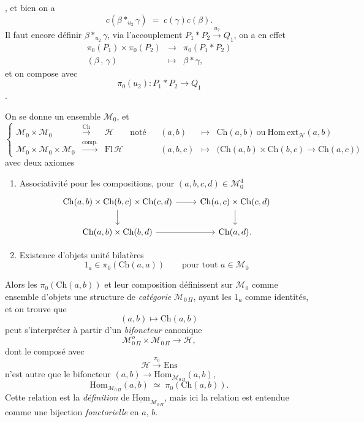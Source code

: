 \documentclass[11pt]{article}
\newcommand{\printedpage}[1]{\marginpar{\footnotesize p.~#1}}
\newcommand{\msp}[1]{\marginpar{\footnotesize [#1]}}
\newcommand{\MOP}{\mathcal{M}_{0\,\Pi}}
\begin{document}
\printedpage{5}
, et bien on a
\[
\boxed{\;c(\beta *_{u_2}\gamma) \;=\; c(\gamma)c(\beta).\;}
\]
Il faut encore définir $\beta *_{u_2}\gamma$, via l'accouplement $P_1*P_2\xrightarrow{u_2}Q_1$, on a en effet
\[
\begin{array}{ccc}
\pi_0(P_1)\times\pi_0(P_2) & \longrightarrow & \pi_0(P_1*P_2)\\
(\beta\,,\,\gamma) & \longmapsto & \beta*\gamma,
\end{array}
\]
et on compose avec
\[
\pi_0(u_2) : P_1*P_2 \longrightarrow Q_1
\]
.

\msp{page 7}
On se donne un ensemble $\mathcal{M}_0$, et
\[
\left\{
\begin{array}{rclccrcl}
\mathcal{M}_0\times\mathcal{M}_0 & \xrightarrow{\mathrm{Ch}} & \mathcal{H} & \text{noté} & & (a,b) & \longmapsto & \mathrm{Ch}(a,b)\ \text{ou}\ \mathrm{Hom\,ext}_{\mathcal{H}}(a,b)\\
\mathcal{M}_0\times\mathcal{M}_0\times\mathcal{M}_0 & \xrightarrow{\text{comp.}} & \mathrm{Fl}\,\mathcal{H} & & & (a,b,c) & \longmapsto & \bigl(\mathrm{Ch}(a,b)\times\mathrm{Ch}(b,c)\longrightarrow\mathrm{Ch}(a,c)\bigr)
\end{array}
\right.
\]
avec deux axiomes

\begin{enumerate}
\item[a)] Associativité pour les compositions, pour $(a,b,c,d)\in\mathcal{M}_0^4$
\[
\begin{tikzcd}
\mathrm{Ch}(a,b)\times\mathrm{Ch}(b,c)\times\mathrm{Ch}(c,d) \arrow[r] \arrow[d] & \mathrm{Ch}(a,c)\times\mathrm{Ch}(c,d) \arrow[d]\\
\mathrm{Ch}(a,b)\times\mathrm{Ch}(b,d) \arrow[r] & \mathrm{Ch}(a,d).
\end{tikzcd}
\]
\item[b)] Existence d'objets unité bilatères
\[
1_a\in\pi_0(\mathrm{Ch}(a,a)) \qquad \text{pour tout } a\in\mathcal{M}_0
\]
\end{enumerate}

Alors les $\pi_0(\mathrm{Ch}(a,b))$ et leur composition définissent sur $\mathcal{M}_0$ comme ensemble d'objets une structure de \textit{catégorie} $\MOP$, ayant les $1_a$ comme identités, et on trouve que
\[
(a,b)\longmapsto\mathrm{Ch}(a,b)
\]
peut s'interpréter à partir d'un \textit{bifoncteur} canonique
\[
\mathcal{M}^o_{0\,\Pi}\times\MOP \longrightarrow \mathcal{H},
\]
dont le composé avec
\[
\mathcal{H}\xrightarrow{\pi_0}\mathrm{Ens}
\]
n'est autre que le bifoncteur $(a,b)\longrightarrow\mathrm{Hom}_{\MOP}(a,b)$,
\printedpage{6}
\msp{page 8}
\[
\mathrm{Hom}_{\MOP}(a,b) \;\simeq\; \pi_0(\mathrm{Ch}(a,b)).
\]
Cette relation est la \textit{définition} de $\underline{\mathrm{Hom}}_{\MOP}$, mais ici la relation est entendue comme une %
bijection \textit{fonctorielle} en $a$, $b$.
\end{document}
